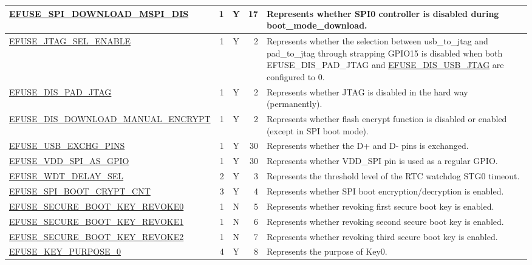 \begin{longtable}[l]{ |m{8.2cm}|r|c|r|m{9cm}| }
    \hline
    \hyperref[fielddesc:EFUSESPIDOWNLOADMSPIDIS]{EFUSE\_SPI\_DOWNLOAD\_MSPI\_DIS} & 1 & Y & 17 & Represents whether SPI0 controller is disabled during boot\_mode\_download.\\
    \hline
    \hyperref[fielddesc:EFUSEJTAGSELENABLE]{EFUSE\_JTAG\_SEL\_ENABLE} & 1 & Y & 2 & Represents whether the selection between usb\_to\_jtag and pad\_to\_jtag through strapping GPIO15 is disabled when both EFUSE\_DIS\_PAD\_JTAG and \hyperref[fielddesc:EFUSEDISUSBJTAG]{EFUSE\_DIS\_USB\_JTAG} are configured to 0.\\
    \hline
    \hyperref[fielddesc:EFUSEDISPADJTAG]{EFUSE\_DIS\_PAD\_JTAG} & 1 & Y & 2 & Represents whether JTAG is disabled in the hard way (permanently).\\
    \hline
    \hyperref[fielddesc:EFUSEDISDOWNLOADMANUALENCRYPT]{EFUSE\_DIS\_DOWNLOAD\_MANUAL\_ENCRYPT} &  1 & Y & 2 & Represents whether flash encrypt function is disabled or enabled (except in SPI boot mode).\\
    \hline
    \hyperref[fielddesc:EFUSEUSBEXCHGPINS]{EFUSE\_USB\_EXCHG\_PINS} & 1 & Y & 30 & Represents whether the D+ and D- pins is exchanged.\\
    \hline
    \hyperref[fielddesc:EFUSEVDDSPIASGPIO]{EFUSE\_VDD\_SPI\_AS\_GPIO} & 1 & Y & 30 & Represents whether VDD\_SPI pin is used as a regular GPIO.\\
    \hline
    \hyperref[fielddesc:EFUSEWDTDELAYSEL]{EFUSE\_WDT\_DELAY\_SEL} & 2 & Y & 3 & Represents the threshold level of the RTC watchdog STG0 timeout.\\
    \hline
    \hyperref[fielddesc:EFUSESPIBOOTCRYPTCNT]{EFUSE\_SPI\_BOOT\_CRYPT\_CNT} & 3 & Y & 4 & Represents whether SPI boot encryption/decryption is enabled.\\
    \hline
    \hyperref[fielddesc:EFUSESECUREBOOTKEYREVOKE0]{EFUSE\_SECURE\_BOOT\_KEY\_REVOKE0} & 1 & N & 5 & Represents whether revoking first secure boot key is enabled.\\
    \hline
    \hyperref[fielddesc:EFUSESECUREBOOTKEYREVOKE1]{EFUSE\_SECURE\_BOOT\_KEY\_REVOKE1} & 1 & N & 6 & Represents whether revoking second secure boot key is enabled.\\
    \hline
    \hyperref[fielddesc:EFUSESECUREBOOTKEYREVOKE2]{EFUSE\_SECURE\_BOOT\_KEY\_REVOKE2} & 1 & N & 7 & Represents whether revoking third secure boot key is enabled.\\
    \hline
    \hyperref[fielddesc:EFUSEKEYPURPOSE0]{EFUSE\_KEY\_PURPOSE\_0} & 4 & Y & 8 & Represents the purpose of Key0.\\

\end{longtable}

